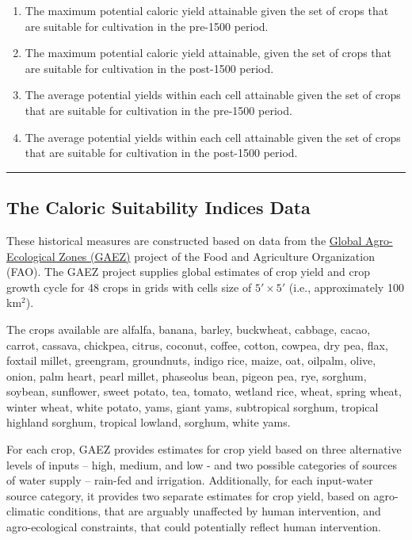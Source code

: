 \documentclass{article}
\begin{document}
\begin{enumerate}
\def\labelenumi{\arabic{enumi}.}
\itemsep1pt\parskip0pt
\item
  The maximum potential caloric yield attainable given the set of crops
  that are suitable for cultivation in the pre-1500 period.
\item
  The maximum potential caloric yield attainable, given the set of crops
  that are suitable for cultivation in the post-1500 period.
\item
  The average potential yields within each cell attainable given the set
  of crops that are suitable for cultivation in the pre-1500 period.
\item
  The average potential yields within each cell attainable given the set
  of crops that are suitable for cultivation in the post-1500 period.
\end{enumerate}

\begin{center}\rule{0.5\linewidth}{\linethickness}\end{center}

    \subsection{The Caloric Suitability Indices
Data}\label{the-caloric-suitability-indices-data}

    These historical measures are constructed based on data from the
\href{http://http://gaez.fao.org/}{Global Agro-Ecological Zones (GAEZ)}
project of the Food and Agriculture Organization (FAO). The GAEZ project
supplies global estimates of crop yield and crop growth cycle for 48
crops in grids with cells size of \(5'\times5'\) (i.e., approximately
100 km\(^2\)).

The crops available are alfalfa, banana, barley, buckwheat, cabbage,
cacao, carrot, cassava, chickpea, citrus, coconut, coffee, cotton,
cowpea, dry pea, flax, foxtail millet, greengram, groundnuts, indigo
rice, maize, oat, oilpalm, olive, onion, palm heart, pearl millet,
phaseolus bean, pigeon pea, rye, sorghum, soybean, sunflower, sweet
potato, tea, tomato, wetland rice, wheat, spring wheat, winter wheat,
white potato, yams, giant yams, subtropical sorghum, tropical highland
sorghum, tropical lowland, sorghum, white yams.

For each crop, GAEZ provides estimates for crop yield based on three
alternative levels of inputs -- high, medium, and low - and two possible
categories of sources of water supply -- rain-fed and irrigation.
Additionally, for each input-water source category, it provides two
separate estimates for crop yield, based on agro-climatic conditions,
that are arguably unaffected by human intervention, and agro-ecological
constraints, that could potentially reflect human intervention.
\end{document}
